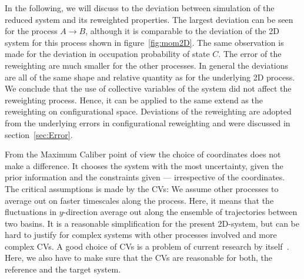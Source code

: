 In the following, we will discuss to the deviation between simulation of the reduced system and its reweighted properties.  The largest deviation can be seen for the process $A \rightarrow B$, although it is comparable to the deviation of the 2D system for this process shown in figure~\ref{fig:mom2D}. The same observation is made for the deviation in occupation probability of state $C$. The error of the reweighting are much smaller for the other processes. In general the deviations are all of the same shape and relative quantity as for the underlying 2D process. We conclude that the use of collective variables of the system did not affect the reweighting process. Hence, it can be applied to the same extend as the reweighting on configurational space. Deviations of the reweighting are adopted from the underlying errors in configurational reweighting and were discussed in section~\ref{sec:Error}.

From the Maximum Caliber point of view the choice of coordinates does not make a difference. It chooses the system with the most uncertainty, given the prior information and the constraints given --- irrespective of the coordinates. The critical assumptions is made by the CVs: We assume other processes to average out on faster timescales along the process. Here, it means that the fluctuations in $y$-direction average out along the ensemble of trajectories between two basins. It is a reasonable simplification for the present 2D-system, but can be hard to justify for complex systems with other processes involved and more complex CVs. A good choice of CVs is a problem of current research by itself~\cite{rohrdanz2013discovering}. Here, we also have to make sure that the CVs are reasonable for both, the reference and the target system. 




\FloatBarrier

